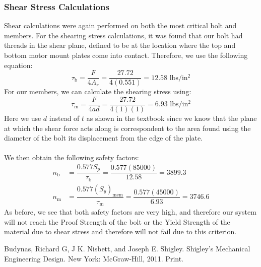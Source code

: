 \documentclass[letterpaper,12pt]{article}
\begin{document}
\subsubsection{Shear Stress Calculations}
Shear calculations were again performed on both the most critical bolt and members. For the shearing stress calculations, it was found that our bolt had threads in the shear plane, defined to be at the location where the top and bottom motor mount plates come into contact. Therefore, we use the following equation:
\begin{equation*}
    \tau_{\text{b}} = \dfrac{F}{4A_r} = \dfrac{27.72}{4(0.551)} = 12.58 \text{ lbs/in$^2$}
\end{equation*}
For our members, we can calculate the shearing stress using:
\begin{equation*}
    \tau_{\text{m}} = \dfrac{F}{4ad} = \dfrac{27.72}{4(1)(1)} = 6.93 \text{ lbs/in$^2$}
\end{equation*}
Here we use $d$ instead of $t$ as shown in the textbook since we know that the plane at which the shear force acts along is correspondent to the area found using the diameter of the bolt its displacement from the edge of the plate.\\\\
We then obtain the following safety factors:
\begin{align*}
    n_{\text{b}} &= \dfrac{0.577S_p}{\tau_{\text{b}}} = \dfrac{0.577(85000)}{12.58} = 3899.3\\
    n_{\text{m}} &= \dfrac{0.577(S_y)_{\text{mem}}}{\tau_{\text{m}}} = \dfrac{0.577(45000)}{6.93} = 3746.6
\end{align*}
As before, we see that both safety factors are very high, and therefore our system will not reach the Proof Strength of the bolt or the Yield Strength of the material due to shear stress and therefore will not fail due to this criterion.

\begin{thebibliography}{9}
Budynas, Richard G, J K. Nisbett, and Joseph E. Shigley. Shigley's Mechanical Engineering Design. New York: McGraw-Hill, 2011. Print. 
\end{thebibliography}
\end{document}
